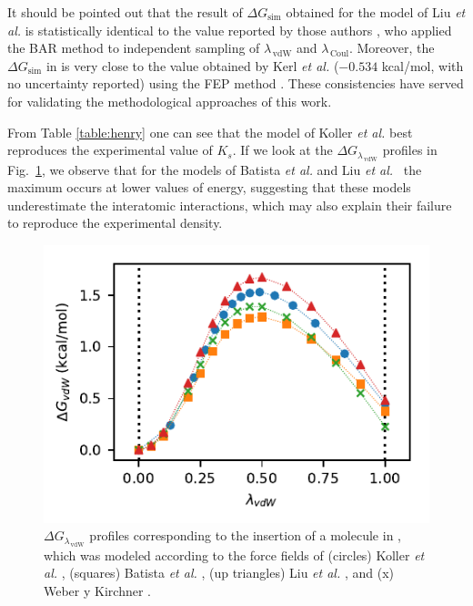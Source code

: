 \documentclass[3p,twocolumn]{elsarticle}
\begin{document}
It should be pointed out that the result of $\Delta G_\text{sim}$ obtained for the model of Liu \textit{et al.} \cite{Liu_2014} is statistically identical to the value reported by those authors \cite{Liu_2014_1}, who applied the BAR method \cite{Bennett_1976} to independent sampling of $\lambda_{\,\text{vdW}}$ and $\lambda_{\, \text{Coul}}$.
Moreover, the $\Delta G_\text{sim}$ in \ce{[emim][NTf_2]} is very close to the value obtained by Kerl \textit{et al.} \cite{Kerl__2017} ($-0.534$ kcal/mol, with no uncertainty reported) using the FEP method \cite{Zwanzig_1954}.
These consistencies have served for validating the methodological approaches of this work.

From Table \ref{table:henry} one can see that the model of Koller \textit{et al.} \cite{Koller_2012} best reproduces the experimental value of $K_s$.
If we look at the $\Delta G_{\lambda_{\,\text{vdW}}}$ profiles in Fig.~\ref{fig:deltag}, we observe that for the models of Batista \textit{et al.} \cite{Batista_2015} and Liu \textit{et al.}~\cite{Liu_2014} the maximum occurs at lower values of energy, suggesting that these models underestimate the interatomic interactions, which may also explain their failure to reproduce the experimental density.

\begin{figure}[ht]
\includegraphics[width=\linewidth]{free_energy_paper}
\caption{$\Delta G_{\lambda_{\,\text{vdW}}}$ profiles corresponding to the insertion of a  molecule in \ce{[emim][B(CN)_4]}, which was modeled according to the force fields of (circles) Koller \textit{et al.} \cite{Koller_2012}, (squares) Batista \textit{et al.} \cite{Batista_2015}, (up triangles) Liu \textit{et al.} \cite{Liu_2014}, and (x) Weber y Kirchner \cite{Weber_2016}.}
\label{fig:deltag}
\end{figure}
\end{document}
